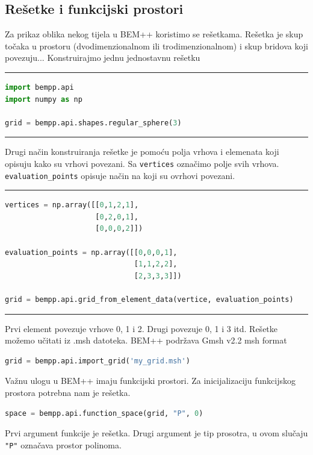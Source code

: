 \documentclass[a4paper,twoside,12pt]{memoir} %
\begin{document}
\subsection{Rešetke i funkcijski prostori}
Za prikaz oblika nekog tijela u BEM++ koristimo se rešetkama. Rešetka je skup točaka u prostoru (dvodimenzionalnom ili trodimenzionalnom) i skup bridova koji povezuju... Konstruirajmo jednu jednostavnu rešetku \\
\hrule
\begin{lstlisting}[language=Python]
import bempp.api
import numpy as np

grid = bempp.api.shapes.regular_sphere(3)
\end{lstlisting}
\hrule 
\vspace{1cm}
Drugi način konstruiranja rešetke je pomoću polja vrhova i elemenata koji opisuju kako su vrhovi povezani. Sa \texttt{vertices} označimo polje svih vrhova. \texttt{evaluation\_points} opisuje način na koji su ovrhovi povezani.  \\
\hrule
\begin{lstlisting}[language=Python]
vertices = np.array([[0,1,2,1],
                     [0,2,0,1],
                     [0,0,0,2]])
                     
evaluation_points = np.array([[0,0,0,1],
                              [1,1,2,2],
                              [2,3,3,3]])
                              
grid = bempp.api.grid_from_element_data(vertice, evaluation_points)
\end{lstlisting} 
\hrule
\vspace{1cm}
Prvi element povezuje vrhove 0, 1 i 2. Drugi povezuje 0, 1 i 3 itd. 
Rešetke možemo učitati iz .msh datoteka. BEM++ podržava Gmsh v2.2 msh format
\begin{lstlisting}[language=Python]                                                       
grid = bempp.api.import_grid('my_grid.msh')
\end{lstlisting}
Važnu ulogu u BEM++ imaju funkcijski prostori. Za inicijalizaciju funkcijskog prostora potrebna nam je rešetka. 
\begin{lstlisting}[language=Python]                                                       
space = bempp.api.function_space(grid, "P", 0)
\end{lstlisting} 
Prvi argument funkcije je rešetka. Drugi argument je tip prosotra, u ovom slučaju \texttt{"P"} označava  prostor polinoma. 
\end{document}
